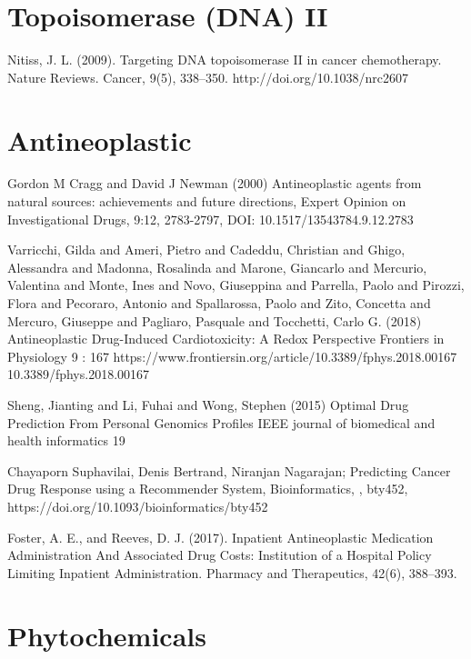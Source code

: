 \begin{thebibliography}{00}
\section{Topoisomerase (DNA) II}

Nitiss, J. L. (2009). 
\newblock Targeting DNA topoisomerase II in cancer chemotherapy. Nature Reviews. 
\newblock Cancer, 9(5), 338–350. http://doi.org/10.1038/nrc2607


\section{Antineoplastic}

Gordon M Cragg and David J Newman (2000) 
\newblock Antineoplastic agents from natural sources: achievements and future directions, 
\newblock Expert Opinion on Investigational Drugs, 9:12, 2783-2797, DOI: 10.1517/13543784.9.12.2783

Varricchi, Gilda and Ameri, Pietro and Cadeddu, Christian and Ghigo, Alessandra and Madonna, Rosalinda and Marone, Giancarlo and Mercurio, Valentina and Monte, Ines and Novo, Giuseppina and Parrella, Paolo and Pirozzi, Flora and Pecoraro, Antonio and Spallarossa, Paolo and Zito, Concetta and Mercuro, Giuseppe and Pagliaro, Pasquale and Tocchetti, Carlo G. (2018)  
\newblock Antineoplastic Drug-Induced Cardiotoxicity: A Redox Perspective 
\newblock Frontiers in Physiology 9 : 167  https://www.frontiersin.org/article/10.3389/fphys.2018.00167 10.3389/fphys.2018.00167

Sheng, Jianting and Li, Fuhai and Wong, Stephen (2015)
\newblock Optimal Drug Prediction From Personal Genomics Profiles
\newblock IEEE journal of biomedical and health informatics 19

 Chayaporn Suphavilai, Denis Bertrand, Niranjan Nagarajan; 
\newblock Predicting Cancer Drug Response using a Recommender System, 
\newblock Bioinformatics, , bty452, https://doi.org/10.1093/bioinformatics/bty452

Foster, A. E., and Reeves, D. J. (2017). 
\newblock Inpatient Antineoplastic Medication Administration And Associated Drug Costs: Institution of a Hospital Policy Limiting Inpatient Administration. 
\newblock Pharmacy and Therapeutics, 42(6), 388–393.

\section{Phytochemicals}


\end{thebibliography}
